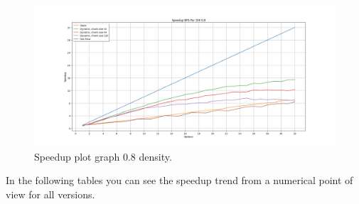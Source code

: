 \begin{figure}[htb!]
    \centering
    \includegraphics[width=\textwidth]{Figures/plot_map_speedup_vs10K08.png}
    \caption{Speedup plot graph 0.8 density.}
    \label{fig:plot_speedup_10k_08}
\end{figure}
\FloatBarrier

In the following tables you can see the speedup trend from a numerical point of view for all versions.

